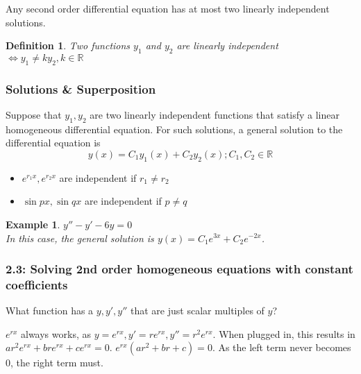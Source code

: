 \documentclass{article}
\newtheorem{definition}{Definition}
\newtheorem{example}{Example}
\begin{document}
Any second order differential equation has at most two linearly independent solutions.
\begin{definition}
	Two functions $y_1$ and $y_2$ are linearly independent $\iff y_1 \neq ky_2, k \in \mathbb{R}$
\end{definition}

\subsubsection{Solutions \& Superposition}
Suppose that $y_1, y_2$ are two linearly independent functions that satisfy a linear homogeneous differential equation. For such solutions, a general solution to the differential equation is 
\begin{equation} y(x)=C_1 y_1(x)+C_2 y_2(x); C_1,C_2 \in \mathbb{R} \end{equation}

\begin{itemize}
	\item $e^{r_1 x},e^{r_2 x}$ are independent if $r_1 \neq r_2 $
	\item $\sin{px}, \sin{qx}$ are independent if $p \neq q$
\end{itemize}

\begin{example} $y''-y'-6y=0$
	\\ In this case, the general solution is $y(x)=C_1e^{3x}+C_2e^{-2x}$.
\end{example}

\subsubsection{2.3: Solving 2nd order homogeneous equations with constant coefficients}

	What function has a $y, y', y''$ that are just scalar multiples of $y$?
	
	$e^{rx}$ always works, as $y=e^{rx}, y'=re^{rx}, y''=r^2e^{rx}$. When plugged in, this results in $ar^2e^{rx}+bre^{rx}+ce^{rx}=0$. $e^{rx}(ar^2+br+c)=0$. As the left term never becomes 0, the right term must.
	
\end{document}
